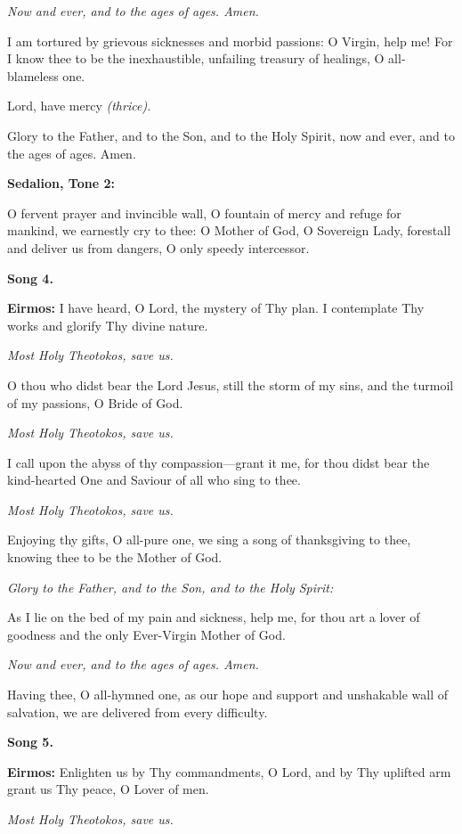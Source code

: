 \emph{Now and ever, and to the ages of ages. Amen.}

I am tortured by grievous sicknesses and morbid passions: O Virgin, help me! 
For I know thee to be the inexhaustible, unfailing treasury of healings, O all-blameless one.

Lord, have mercy 
\emph{(thrice).}

Glory to the Father, and to the Son, and to the Holy Spirit, now and ever, and to the ages of ages. Amen.

\textbf{Sedalion, Tone 2:}

O fervent prayer and invincible wall, O fountain of mercy and refuge for mankind, we earnestly cry to thee: 
O Mother of God, O Sovereign Lady, forestall and deliver us from dangers, O only speedy intercessor.

\textbf{Song 4.}

\textbf{Eirmos:} I have heard, O Lord, the mystery of Thy plan. 
I contemplate Thy works and glorify Thy divine nature.

\emph{Most Holy Theotokos, save us.}

O thou who didst bear the Lord Jesus, still the storm of my sins, and the turmoil of my passions, O Bride of God.

\emph{Most Holy Theotokos, save us.}

I call upon the abyss of thy compassion---grant it me, for thou didst bear the kind-hearted One and Saviour of all who sing to thee.

\emph{Most Holy Theotokos, save us.}

Enjoying thy gifts, O all-pure one, we sing a song of thanksgiving to thee, knowing thee to be the Mother of God.

\emph{Glory to the Father, and to the Son, and to the Holy Spirit:}

As I lie on the bed of my pain and sickness, help me, for thou art a lover of goodness and the only Ever-Virgin Mother of God.

\emph{Now and ever, and to the ages of ages. Amen.}

Having thee, O all-hymned one, as our hope and support and unshakable wall of salvation, we are delivered from every difficulty.

\textbf{Song 5.}

\textbf{Eirmos:} 
Enlighten us by Thy commandments, O Lord, and by Thy uplifted arm grant us Thy peace, O Lover of men.

\emph{Most Holy Theotokos, save us.}

